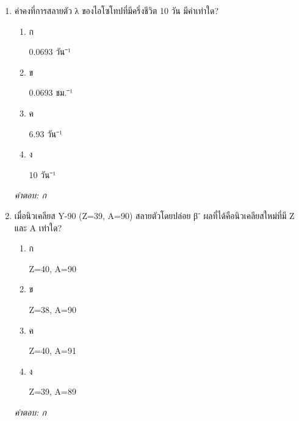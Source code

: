 \documentclass[12pt]{article}
\begin{document}
\begin{enumerate}[label=\arabic*., itemsep=0.5\baselineskip, topsep=0.5\baselineskip, leftmargin=*]
\item ค่าคงที่การสลายตัว λ ของไอโซโทปที่มีครึ่งชีวิต 10 วัน มีค่าเท่าใด?
\begin{enumerate}[label=\alph*)., itemsep=0.3\baselineskip, topsep=0.3\baselineskip]
\item ก\ 
\begin{minipage}[t]{0.9\linewidth}
\raggedright 0.0693 วัน⁻¹
\end{minipage}
\item ข\ 
\begin{minipage}[t]{0.9\linewidth}
\raggedright 0.0693 ชม.⁻¹
\end{minipage}
\item ค\ 
\begin{minipage}[t]{0.9\linewidth}
\raggedright 6.93 วัน⁻¹
\end{minipage}
\item ง\ 
\begin{minipage}[t]{0.9\linewidth}
\raggedright 10 วัน⁻¹
\end{minipage}
\end{enumerate}
\vspace{-0.3\baselineskip}
\begin{small}
\textit{คำตอบ: ก}
\end{small}

\item เมื่อนิวเคลียส Y-90 (Z=39, A=90) สลายตัวโดยปล่อย β⁻ ผลที่ได้คือนิวเคลียสใหม่ที่มี Z และ A เท่าใด?
\begin{enumerate}[label=\alph*)., itemsep=0.3\baselineskip, topsep=0.3\baselineskip]
\item ก\ 
\begin{minipage}[t]{0.9\linewidth}
\raggedright Z=40, A=90
\end{minipage}
\item ข\ 
\begin{minipage}[t]{0.9\linewidth}
\raggedright Z=38, A=90
\end{minipage}
\item ค\ 
\begin{minipage}[t]{0.9\linewidth}
\raggedright Z=40, A=91
\end{minipage}
\item ง\ 
\begin{minipage}[t]{0.9\linewidth}
\raggedright Z=39, A=89
\end{minipage}
\end{enumerate}
\vspace{-0.3\baselineskip}
\begin{small}
\textit{คำตอบ: ก}
\end{small}


\end{enumerate}
\end{document}
